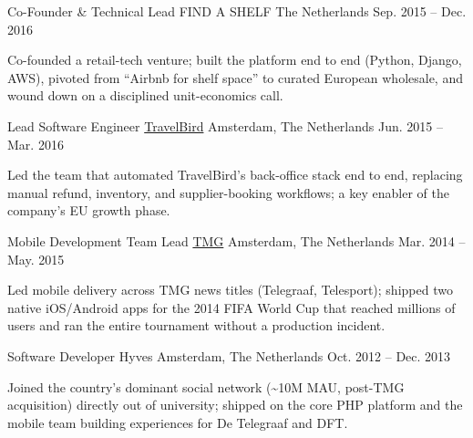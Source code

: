 \begin{cventries}
  \cventry
    {Co-Founder \& Technical Lead} %
    {FIND A SHELF} %
    {The Netherlands} %
    {Sep. 2015 -- Dec. 2016} %
    {
      \begin{cvitems}
        \item {Co-founded a retail-tech venture; built the platform end to end (Python, Django, AWS), pivoted from ``Airbnb for shelf space'' to curated European wholesale, and wound down on a disciplined unit-economics call.}
      \end{cvitems}
    }

  \cventry
    {Lead Software Engineer} %
    {\href{https://travelbird.nl/}{TravelBird}} %
    {Amsterdam, The Netherlands} %
    {Jun. 2015 -- Mar. 2016} %
    {
      \begin{cvitems}
        \item {Led the team that automated TravelBird's back-office stack end to end, replacing manual refund, inventory, and supplier-booking workflows; a key enabler of the company's EU growth phase.}
      \end{cvitems}
    }

  \cventry
    {Mobile Development Team Lead} %
    {\href{https://www.tmg.nl/nl}{TMG}} %
    {Amsterdam, The Netherlands} %
    {Mar. 2014 -- May. 2015} %
    {
      \begin{cvitems}
        \item {Led mobile delivery across TMG news titles (Telegraaf, Telesport); shipped two native iOS/Android apps for the 2014 FIFA World Cup that reached millions of users and ran the entire tournament without a production incident.}
      \end{cvitems}
    }

  \cventry
    {Software Developer} %
    {Hyves} %
    {Amsterdam, The Netherlands} %
    {Oct. 2012 -- Dec. 2013} %
    {
      \begin{cvitems}
        \item {Joined the country's dominant social network (\textasciitilde10M MAU, post-TMG acquisition) directly out of university; shipped on the core PHP platform and the mobile team building experiences for De Telegraaf and DFT.}
      \end{cvitems}
    }

\end{cventries}
